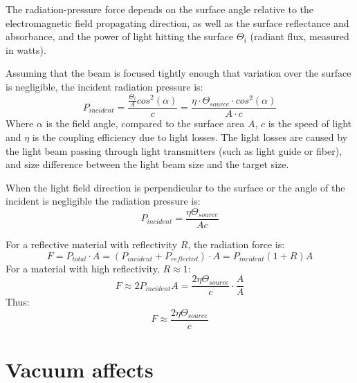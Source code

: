\documentclass[\main/master.tex]{subfiles}
\begin{document}
\par\noindent
The radiation-pressure force depends on the surface angle relative to the electromagnetic field propagating direction, as well as the surface reflectance and absorbance, and the power of light hitting the surface $\Theta_i$ (radiant flux, measured in watts). 
\par\noindent
Assuming that the beam is focused tightly enough that variation over the surface is negligible, the incident radiation pressure is:
\begin{equation}
P_{incident} = \frac{\frac{\Theta_i}{A}cos^2(\alpha)}{c} = \frac{\eta\cdot \Theta_{source}\cdot cos^2(\alpha)}{{A\cdot c}} \label{eqn:radiation_pressure}
\end{equation}
Where $\alpha$ is the field angle, compared to the surface area $A$, $c$ is the speed of light and $\eta$ is the coupling efficiency due to light losses. The light losses are caused by the light beam passing through light transmitters (such as light guide or fiber), and size difference between the light beam size and the target size. 
\par\noindent
When the light field direction is perpendicular to the surface or the angle of the incident is negligible the radiation pressure is:
\begin{equation}
P_{incident} = \frac{\eta\Theta_{source}}{{Ac}} \label{eqn:radiation_pressure_perpendicular}
\end{equation}
\par\noindent
For a reflective material with reflectivity $R$, the radiation force is:
\begin{equation}
F = P_{total}\cdot A = (P_{incident}+P_{reflected})\cdot A = P_{incident}(1+R)A \label{eqn:radiation_force}
\end{equation}
For a material with high reflectivity, $R\approx 1$:
\begin{equation}
F \approx 2P_{incident}A = \frac{2\eta\Theta_{source}}{{c}}\cdot \frac{A}{A} \label{eqn:radiation_force_reflective}
\end{equation}
Thus:
\begin{equation}
F \approx \frac{2\eta\Theta_{source}}{{c}} \label{eqn:radiation_force_power}
\end{equation}

\section{Vacuum affects}
\end{document}
